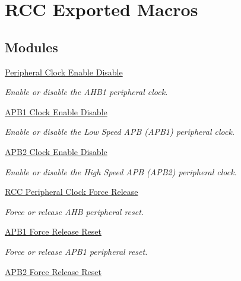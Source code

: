 \hypertarget{group___r_c_c___exported___macros}{\section{R\-C\-C Exported Macros}
\label{group___r_c_c___exported___macros}
}
\subsection*{Modules}
\begin{DoxyCompactItemize}
\item 
\hyperlink{group___r_c_c___peripheral___clock___enable___disable}{Peripheral Clock Enable Disable}
\begin{DoxyCompactList}\small\item\em Enable or disable the A\-H\-B1 peripheral clock. \end{DoxyCompactList}\item 
\hyperlink{group___r_c_c___a_p_b1___clock___enable___disable}{A\-P\-B1 Clock Enable Disable}
\begin{DoxyCompactList}\small\item\em Enable or disable the Low Speed A\-P\-B (A\-P\-B1) peripheral clock. \end{DoxyCompactList}\item 
\hyperlink{group___r_c_c___a_p_b2___clock___enable___disable}{A\-P\-B2 Clock Enable Disable}
\begin{DoxyCompactList}\small\item\em Enable or disable the High Speed A\-P\-B (A\-P\-B2) peripheral clock. \end{DoxyCompactList}\item 
\hyperlink{group___r_c_c___peripheral___clock___force___release}{R\-C\-C Peripheral Clock Force Release}
\begin{DoxyCompactList}\small\item\em Force or release A\-H\-B peripheral reset. \end{DoxyCompactList}\item 
\hyperlink{group___r_c_c___a_p_b1___force___release___reset}{A\-P\-B1 Force Release Reset}
\begin{DoxyCompactList}\small\item\em Force or release A\-P\-B1 peripheral reset. \end{DoxyCompactList}\item 
\hyperlink{group___r_c_c___a_p_b2___force___release___reset}{A\-P\-B2 Force Release Reset}

\end{DoxyCompactItemize}
